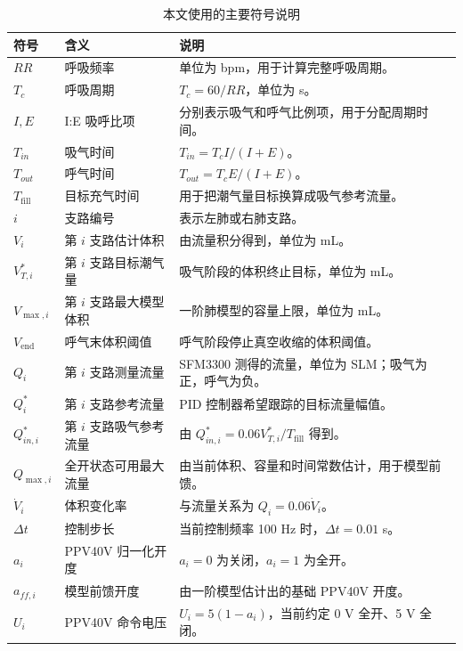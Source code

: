 \documentclass[UTF8,11pt,a4paper]{ctexart}
\renewcommand{\arraystretch}{1.18}
\begin{document}
\begin{table}[H]
\centering
\caption{本文使用的主要符号说明}
\label{tab:notation}
\scriptsize
\setlength{\tabcolsep}{4pt}
\renewcommand{\arraystretch}{1.12}
\begin{tabularx}{0.96\textwidth}{
  >{\centering\arraybackslash}p{2.0cm}
  >{\raggedright\arraybackslash}p{3.2cm}
  X
}
\toprule
\textbf{符号} & \textbf{含义} & \textbf{说明} \\
\midrule
$RR$ & 呼吸频率 & 单位为 bpm，用于计算完整呼吸周期。 \\
$T_c$ & 呼吸周期 & $T_c=60/RR$，单位为 s。 \\
$I,E$ & I:E 吸呼比项 & 分别表示吸气和呼气比例项，用于分配周期时间。 \\
$T_{in}$ & 吸气时间 & $T_{in}=T_c I/(I+E)$。 \\
$T_{out}$ & 呼气时间 & $T_{out}=T_c E/(I+E)$。 \\
$T_{\mathrm{fill}}$ & 目标充气时间 & 用于把潮气量目标换算成吸气参考流量。 \\
$i$ & 支路编号 & 表示左肺或右肺支路。 \\
$V_i$ & 第 $i$ 支路估计体积 & 由流量积分得到，单位为 mL。 \\
$V^*_{T,i}$ & 第 $i$ 支路目标潮气量 & 吸气阶段的体积终止目标，单位为 mL。 \\
$V_{\max,i}$ & 第 $i$ 支路最大模型体积 & 一阶肺模型的容量上限，单位为 mL。 \\
$V_{\mathrm{end}}$ & 呼气末体积阈值 & 呼气阶段停止真空收缩的体积阈值。 \\
$Q_i$ & 第 $i$ 支路测量流量 & SFM3300 测得的流量，单位为 SLM；吸气为正，呼气为负。 \\
$Q^*_i$ & 第 $i$ 支路参考流量 & PID 控制器希望跟踪的目标流量幅值。 \\
$Q^*_{in,i}$ & 第 $i$ 支路吸气参考流量 & 由 $Q^*_{in,i}=0.06V^*_{T,i}/T_{\mathrm{fill}}$ 得到。 \\
$Q_{\max,i}$ & 全开状态可用最大流量 & 由当前体积、容量和时间常数估计，用于模型前馈。 \\
$\dot V_i$ & 体积变化率 & 与流量关系为 $Q_i=0.06\dot V_i$。 \\
$\Delta t$ & 控制步长 & 当前控制频率 100 Hz 时，$\Delta t=0.01$ s。 \\
$a_i$ & PPV40V 归一化开度 & $a_i=0$ 为关闭，$a_i=1$ 为全开。 \\
$a_{ff,i}$ & 模型前馈开度 & 由一阶模型估计出的基础 PPV40V 开度。 \\
$U_i$ & PPV40V 命令电压 & $U_i=5(1-a_i)$，当前约定 0 V 全开、5 V 全闭。 \\

\end{tabularx}
\end{table}
\end{document}
